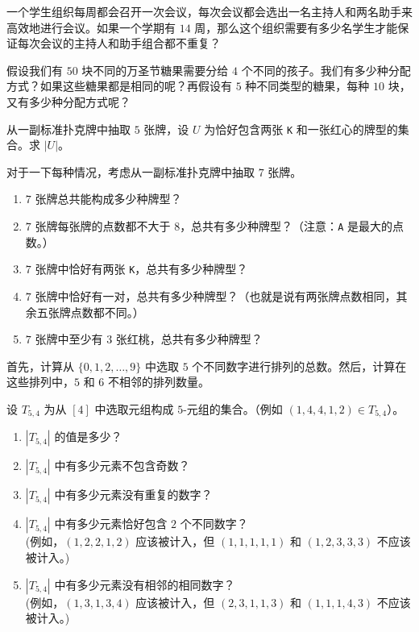 \begin{exercise}
    一个学生组织每周都会召开一次会议，每次会议都会选出一名主持人和两名助手来高效地进行会议。如果一个学期有 $14$ 周，那么这个组织需要有多少名学生才能保证每次会议的主持人和助手组合都不重复？
\end{exercise}

\begin{exercise}
    假设我们有 $50$ 块不同的万圣节糖果需要分给 $4$ 个不同的孩子。我们有多少种分配方式？如果这些糖果都是相同的呢？再假设有 $5$ 种不同类型的糖果，每种 $10$ 块，又有多少种分配方式呢？
\end{exercise}

\begin{exercise}
    从一副标准扑克牌中抽取 $5$ 张牌，设 $U$ 为恰好包含两张 \verb|K| 和一张红心的牌型的集合。求 $|U|$。
\end{exercise}

\begin{exercise}
    对于一下每种情况，考虑从一副标准扑克牌中抽取 $7$ 张牌。
    \begin{enumerate}[label=(\alph*)]
        \item $7$ 张牌总共能构成多少种牌型？
        \item $7$ 张牌每张牌的点数都不大于 $8$，总共有多少种牌型？（注意：\verb|A| 是最大的点数。）
        \item $7$ 张牌中恰好有两张 \verb|K|，总共有多少种牌型？
        \item $7$ 张牌中恰好有一对，总共有多少种牌型？（也就是说有两张牌点数相同，其余五张牌点数都不同。）
        \item $7$ 张牌中至少有 $3$ 张红桃，总共有多少种牌型？
    \end{enumerate}
\end{exercise}

\begin{exercise}
    首先，计算从 $\{0, 1, 2, \dots , 9\}$ 中选取 $5$ 个不同数字进行排列的总数。然后，计算在这些排列中，$5$ 和 $6$ 不相邻的排列数量。
\end{exercise}

\begin{exercise}
    设 $T_{5,4}$ 为从 $[4]$ 中选取元组构成 $5$-元组的集合。（例如 $(1, 4, 4, 1, 2) \in T_{5,4}$）。
    \begin{enumerate}[label=(\alph*)]
        \item $|T_{5,4}|$ 的值是多少？
        \item $|T_{5,4}|$ 中有多少元素不包含奇数？
        \item $|T_{5,4}|$ 中有多少元素没有重复的数字？
        \item $|T_{5,4}|$ 中有多少元素恰好包含 $2$ 个不同数字？\\
              (例如，$(1, 2, 2, 1, 2)$ 应该被计入，但 $(1, 1, 1, 1, 1)$ 和 $(1, 2, 3, 3, 3)$ 不应该被计入。)
        \item$|T_{5,4}|$ 中有多少元素没有相邻的相同数字？\\
              (例如，$(1, 3, 1, 3, 4)$ 应该被计入，但 $(2, 3, 1, 1, 3)$ 和 $(1, 1, 1, 4, 3)$ 不应该被计入。)
    \end{enumerate}
\end{exercise}

